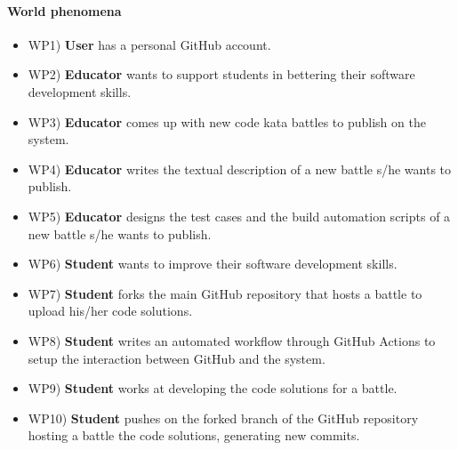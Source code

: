 	\paragraph{World phenomena}
	\begin{itemize}
		\item WP1) \textbf{User} has a personal GitHub account.
		\item WP2) \textbf{Educator} wants to support students in bettering their software development skills.
		\item WP3) \textbf{Educator} comes up with new code kata battles to publish on the system.
		\item WP4) \textbf{Educator} writes the textual description of a new battle s/he wants to publish.
		\item WP5) \textbf{Educator} designs the test cases and the build automation scripts of a new battle s/he wants to publish.
		\item WP6) \textbf{Student} wants to improve their software development skills.
		\item WP7) \textbf{Student} forks the main GitHub repository that hosts a battle to upload 	his/her code solutions.
		\item WP8) \textbf{Student} writes an automated workflow through GitHub Actions to setup the interaction between GitHub and the system.
		\item WP9) \textbf{Student} works at developing the code solutions for a battle.
		\item WP10) \textbf{Student} pushes on the forked branch of the GitHub repository hosting a 	battle the code solutions, generating new commits.
	\end{itemize}
	

